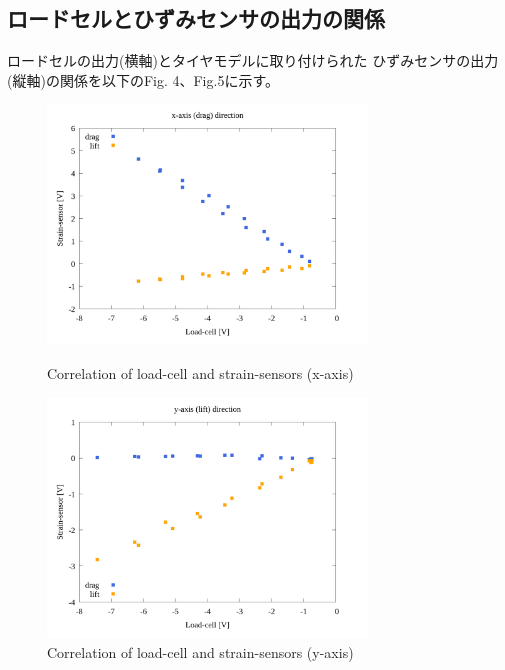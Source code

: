\documentclass[twocolumn,a4j]{jsarticle}
\begin{document}
\subsection{ロードセルとひずみセンサの出力の関係}
ロードセルの出力(横軸)とタイヤモデルに取り付けられた
ひずみセンサの出力(縦軸)の関係を以下のFig. 4、Fig.5に示す。
\begin{figure}[htbp]
    \footnotesize
    \begin{center}
        \includegraphics[width=85mm]{images/05_strainsensor-loadcell_x.png}
        \caption{Correlation of load-cell and strain-sensors (x-axis)}
        \includegraphics[width=85mm]{images/06_strainsensor-loadcell_y.png}
        \caption{Correlation of load-cell and strain-sensors (y-axis)}
    \end{center}
\end{figure}
\end{document}
